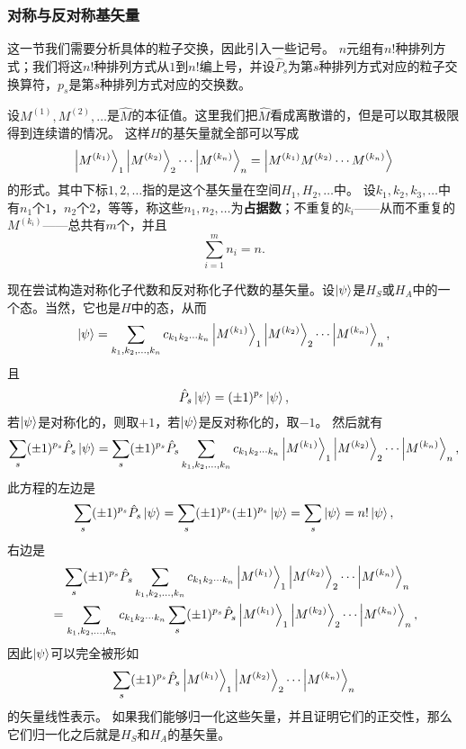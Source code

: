 \documentclass[hyperref, UTF8, a4paper]{ctexart}
\begin{document}
\subsubsection{对称与反对称基矢量}

这一节我们需要分析具体的粒子交换，因此引入一些记号。
$n$元组有$n!$种排列方式；我们将这$n!$种排列方式从$1$到$n!$编上号，并设$\hat{P}_s$为第$s$种排列方式对应的粒子交换算符，$p_s$是第$s$种排列方式对应的交换数。

设$M^{(1)}, M^{(2)}, \ldots$是$\hat{M}$的本征值。这里我们把$\hat{M}$看成离散谱的，但是可以取其极限得到连续谱的情况。
这样$H$的基矢量就全部可以写成
\[
    \ket{M^{(k_1)}}_1 \ket{M^{(k_2)}}_2 \cdots \ket{M^{(k_n)}}_n = \ket{M^{(k_1)} M^{(k_2)} \cdots M^{(k_n)}}
\]
的形式。其中下标$1, 2, \ldots$指的是这个基矢量在空间$H_1, H_2, \ldots$中。
设$k_1, k_2, k_3, \ldots$中有$n_1$个$1$，$n_2$个$2$，等等，称这些$n_1, n_2, \ldots$为\textbf{占据数}；不重复的$k_i$——从而不重复的$M^{(k_i)}$——总共有$m$个，并且
\begin{equation}
    \sum_{i=1}^m n_i = n.
\end{equation}

现在尝试构造对称化子代数和反对称化子代数的基矢量。设$\ket{\psi}$是$H_S$或$H_A$中的一个态。当然，它也是$H$中的态，从而
\[
    \ket{\psi} = \sum_{k_1, k_2, \ldots, k_n} c_{k_1 k_2 \cdots k_n} \ket{M^{(k_1)}}_1 \ket{M^{(k_2)}}_2 \cdots \ket{M^{(k_n)}}_n,
\]
且
\[
    \hat{P}_s \ket{\psi} = (\pm 1)^{p_s} \ket{\psi},
\]
若$\ket{\psi}$是对称化的，则取$+1$，若$\ket{\psi}$是反对称化的，取$-1$。
然后就有
\[
    \sum_s (\pm 1)^{p_s} \hat{P}_s \ket{\psi} = \sum_s (\pm 1)^{p_s} \hat{P}_s \sum_{k_1, k_2, \ldots, k_n} c_{k_1 k_2 \cdots k_n} \ket{M^{(k_1)}}_1 \ket{M^{(k_2)}}_2 \cdots \ket{M^{(k_n)}}_n,
\]
此方程的左边是
\[
    \sum_s (\pm 1)^{p_s} \hat{P}_s \ket{\psi} = \sum_s (\pm 1)^{p_s} (\pm 1)^{p_s} \ket{\psi} = \sum_s \ket{\psi} = n! \ket{\psi},
\]
右边是
\[
    \begin{aligned}
        &\quad \sum_s (\pm 1)^{p_s} \hat{P}_s \sum_{k_1, k_2, \ldots, k_n} c_{k_1 k_2 \cdots k_n} \ket{M^{(k_1)}}_1 \ket{M^{(k_2)}}_2 \cdots \ket{M^{(k_n)}}_n \\
        &= \sum_{k_1, k_2, \ldots, k_n} c_{k_1 k_2 \cdots k_n} \sum_s (\pm 1)^{p_s} \hat{P}_s \ket{M^{(k_1)}}_1 \ket{M^{(k_2)}}_2 \cdots \ket{M^{(k_n)}}_n,
    \end{aligned}
\]
因此$\ket{\psi}$可以完全被形如
\[
    \sum_s (\pm 1)^{p_s} \hat{P}_s \ket{M^{(k_1)}}_1 \ket{M^{(k_2)}}_2 \cdots \ket{M^{(k_n)}}_n
\]
的矢量线性表示。
如果我们能够归一化这些矢量，并且证明它们的正交性，那么它们归一化之后就是$H_S$和$H_A$的基矢量。
\end{document}
